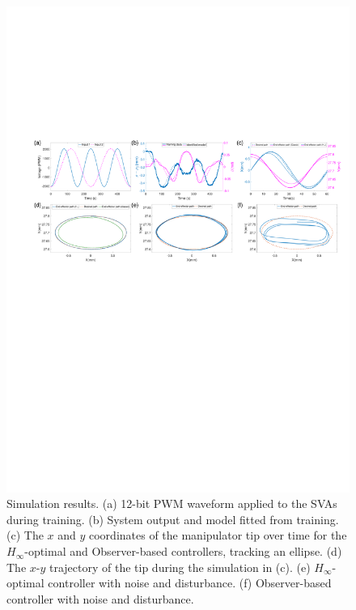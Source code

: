 \begin{figure}[t]
\centering
    \includegraphics[width=\textwidth]{Figure_Sim_6.pdf}
    \caption[]{Simulation results. (a) 12-bit PWM waveform applied to the SVAs during training. (b) System output and model fitted from training. (c) The $x$ and $y$ coordinates of the manipulator tip over time for the $H_\infty$-optimal and Observer-based controllers, tracking an ellipse. (d) The $x$-$y$ trajectory of the tip during the simulation in (c).
    (e) $H_\infty$-optimal controller with noise and disturbance. (f) Observer-based controller with noise and disturbance.} \vspace{-0.5cm}
\label{fig:sim}
\end{figure}

\section{}

